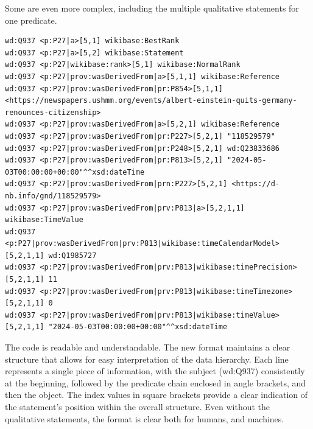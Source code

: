 Some are even more complex, including the multiple qualitative statements for one predicate.

{\footnotesize
\begin{verbatim}
wd:Q937 <p:P27|a>[5,1] wikibase:BestRank
wd:Q937 <p:P27|a>[5,2] wikibase:Statement
wd:Q937 <p:P27|wikibase:rank>[5,1] wikibase:NormalRank
wd:Q937 <p:P27|prov:wasDerivedFrom|a>[5,1,1] wikibase:Reference
wd:Q937 <p:P27|prov:wasDerivedFrom|pr:P854>[5,1,1] <https://newspapers.ushmm.org/events/albert-einstein-quits-germany-renounces-citizenship>
wd:Q937 <p:P27|prov:wasDerivedFrom|a>[5,2,1] wikibase:Reference
wd:Q937 <p:P27|prov:wasDerivedFrom|pr:P227>[5,2,1] "118529579"
wd:Q937 <p:P27|prov:wasDerivedFrom|pr:P248>[5,2,1] wd:Q23833686
wd:Q937 <p:P27|prov:wasDerivedFrom|pr:P813>[5,2,1] "2024-05-03T00:00:00+00:00"^^xsd:dateTime
wd:Q937 <p:P27|prov:wasDerivedFrom|prn:P227>[5,2,1] <https://d-nb.info/gnd/118529579>
wd:Q937 <p:P27|prov:wasDerivedFrom|prv:P813|a>[5,2,1,1] wikibase:TimeValue
wd:Q937 <p:P27|prov:wasDerivedFrom|prv:P813|wikibase:timeCalendarModel>[5,2,1,1] wd:Q1985727
wd:Q937 <p:P27|prov:wasDerivedFrom|prv:P813|wikibase:timePrecision>[5,2,1,1] 11
wd:Q937 <p:P27|prov:wasDerivedFrom|prv:P813|wikibase:timeTimezone>[5,2,1,1] 0
wd:Q937 <p:P27|prov:wasDerivedFrom|prv:P813|wikibase:timeValue>[5,2,1,1] "2024-05-03T00:00:00+00:00"^^xsd:dateTime
\end{verbatim}
}

The code is readable and understandable. The new format maintains a clear structure that allows for easy interpretation of the data hierarchy. Each line represents a single piece of information, with the subject (wd:Q937) consistently at the beginning, followed by the predicate chain enclosed in angle brackets, and then the object. The index values in square brackets provide a clear indication of the statement's position within the overall structure. Even without the qualitative statements, the format is clear both for humans, and machines.



